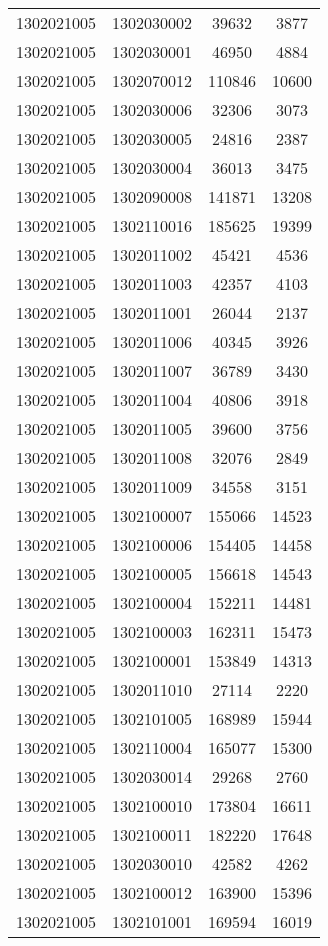 \begin{longtable}{llcc}
1302021005 & 1302030002 & 39632 & 3877\\
1302021005 & 1302030001 & 46950 & 4884\\
1302021005 & 1302070012 & 110846 & 10600\\
1302021005 & 1302030006 & 32306 & 3073\\
1302021005 & 1302030005 & 24816 & 2387\\
1302021005 & 1302030004 & 36013 & 3475\\
1302021005 & 1302090008 & 141871 & 13208\\
1302021005 & 1302110016 & 185625 & 19399\\
1302021005 & 1302011002 & 45421 & 4536\\
1302021005 & 1302011003 & 42357 & 4103\\
1302021005 & 1302011001 & 26044 & 2137\\
1302021005 & 1302011006 & 40345 & 3926\\
1302021005 & 1302011007 & 36789 & 3430\\
1302021005 & 1302011004 & 40806 & 3918\\
1302021005 & 1302011005 & 39600 & 3756\\
1302021005 & 1302011008 & 32076 & 2849\\
1302021005 & 1302011009 & 34558 & 3151\\
1302021005 & 1302100007 & 155066 & 14523\\
1302021005 & 1302100006 & 154405 & 14458\\
1302021005 & 1302100005 & 156618 & 14543\\
1302021005 & 1302100004 & 152211 & 14481\\
1302021005 & 1302100003 & 162311 & 15473\\
1302021005 & 1302100001 & 153849 & 14313\\
1302021005 & 1302011010 & 27114 & 2220\\
1302021005 & 1302101005 & 168989 & 15944\\
1302021005 & 1302110004 & 165077 & 15300\\
1302021005 & 1302030014 & 29268 & 2760\\
1302021005 & 1302100010 & 173804 & 16611\\
1302021005 & 1302100011 & 182220 & 17648\\
1302021005 & 1302030010 & 42582 & 4262\\
1302021005 & 1302100012 & 163900 & 15396\\
1302021005 & 1302101001 & 169594 & 16019\\

\end{longtable}
